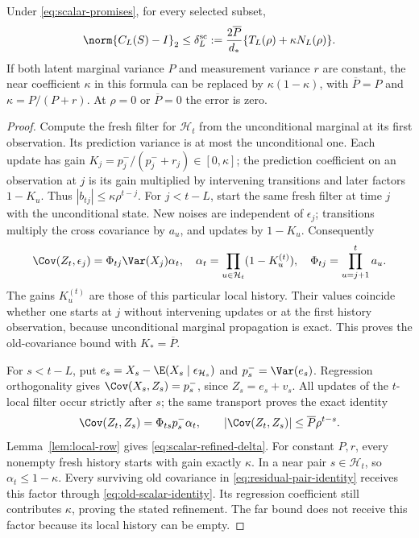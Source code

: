 \begin{theorem}
\label{thm:scalar-locality}
Under \eqref{eq:scalar-promises}, for every selected subset,
\begin{equation}
 \norm{C_L(S)-I}_2\le\delta_L^{\mathrm{sc}}
 :=\frac{2\overline P}{d_*}
       \{T_L(\rho)+\kappa N_L(\rho)\}.
 \label{eq:scalar-refined-delta}
\end{equation}
If both latent marginal variance $P$ and measurement variance $r$ are
constant, the near coefficient $\kappa$ in this formula can be replaced by
$\kappa(1-\kappa)$, with $\overline P=P$ and $\kappa=P/(P+r)$.
At $\rho=0$ or $\overline P=0$ the error is zero.
\end{theorem}
\begin{proof}
Compute the fresh filter for $\mathcal H_t$ from the unconditional marginal
at its first observation. Its prediction variance is at most the
unconditional one. Each update has gain
$K_j=p_j^-/(p_j^-+r_j)\in[0,\kappa]$; the prediction coefficient on an
observation at $j$ is its gain multiplied by intervening transitions and
later factors $1-K_u$. Thus $|b_{tj}|\le\kappa\rho^{t-j}$.
For $j<t-L$, start the same fresh filter at time $j$ with the unconditional
state. New noises are independent of $\epsilon_j$; transitions multiply
the cross covariance by $a_u$, and updates by $1-K_u$. Consequently
\begin{equation}
 \Cov(Z_t,\epsilon_j)=\Phi_{tj}\Var(X_j)\alpha_t,
 \quad \alpha_t=\prod_{u\in\mathcal H_t}(1-K_u^{(t)}),
 \quad \Phi_{tj}=\prod_{u=j+1}^t a_u.
 \label{eq:old-scalar-identity}
\end{equation}
The gains $K_u^{(t)}$ are those of this particular local history. Their
values coincide whether one starts at $j$ without intervening updates or
at the first history observation, because unconditional marginal propagation
is exact. This proves the old-covariance bound with $K_*=\overline P$.

For $s<t-L$, put $e_s=X_s-\E(X_s\mid\epsilon_{\mathcal H_s})$ and
$p_s^-=\Var(e_s)$. Regression orthogonality gives
$\Cov(X_s,Z_s)=p_s^-$, since $Z_s=e_s+v_s$. All updates of the $t$-local
filter occur strictly after $s$; the same transport proves the exact identity
\begin{equation}
 \Cov(Z_t,Z_s)=\Phi_{ts}p_s^-\alpha_t,
 \qquad |\Cov(Z_t,Z_s)|\le\overline P\rho^{t-s}.
 \label{eq:far-scalar-identity}
\end{equation}
Lemma~\ref{lem:local-row} gives \eqref{eq:scalar-refined-delta}.
For constant $P,r$, every nonempty fresh history starts with gain exactly
$\kappa$. In a near pair $s\in\mathcal H_t$, so $\alpha_t\le1-\kappa$.
Every surviving old covariance in \eqref{eq:residual-pair-identity} receives
this factor through \eqref{eq:old-scalar-identity}. Its regression coefficient
still contributes $\kappa$, proving the stated refinement. The far bound
does not receive this factor because its local history can be empty.
\end{proof}

